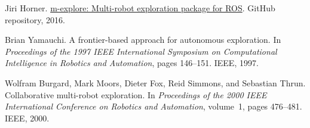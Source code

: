 \documentclass[conference]{IEEEtran}
\begin{document}

\begin{thebibliography}{1}

Jiri Horner.
\newblock \href{https://github.com/hrnr/m-explore}{m-explore: Multi-robot exploration package for ROS}.
\newblock GitHub repository, 2016.

Brian Yamauchi.
\newblock A frontier-based approach for autonomous exploration.
\newblock In \emph{Proceedings of the 1997 IEEE International Symposium on Computational Intelligence in Robotics and Automation}, pages 146--151. IEEE, 1997.

Wolfram Burgard, Mark Moors, Dieter Fox, Reid Simmons, and Sebastian Thrun.
\newblock Collaborative multi-robot exploration.
\newblock In \emph{Proceedings of the 2000 IEEE International Conference on Robotics and Automation}, volume~1, pages 476--481. IEEE, 2000.

\end{thebibliography}
\end{document}
